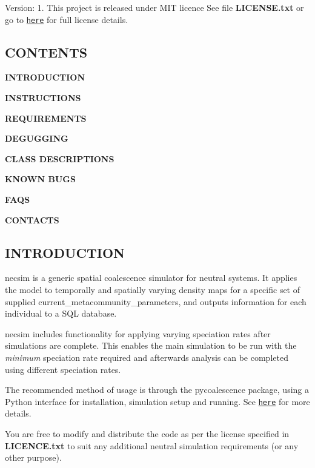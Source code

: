 Version\+: 1. This project is released under M\+IT licence See file {\bfseries L\+I\+C\+E\+N\+S\+E.\+txt} or go to \href{https://opensource.org/licenses/MIT}{\tt here} for full license details.

\subsection*{C\+O\+N\+T\+E\+N\+TS}


\begin{DoxyItemize}
\item {\bfseries I\+N\+T\+R\+O\+D\+U\+C\+T\+I\+ON}
\item {\bfseries I\+N\+S\+T\+R\+U\+C\+T\+I\+O\+NS}
\item {\bfseries R\+E\+Q\+U\+I\+R\+E\+M\+E\+N\+TS}
\item {\bfseries D\+E\+G\+U\+G\+G\+I\+NG}
\item {\bfseries C\+L\+A\+SS D\+E\+S\+C\+R\+I\+P\+T\+I\+O\+NS}
\item {\bfseries K\+N\+O\+WN B\+U\+GS}
\item {\bfseries F\+A\+QS}
\item {\bfseries C\+O\+N\+T\+A\+C\+TS}
\end{DoxyItemize}

\subsection*{I\+N\+T\+R\+O\+D\+U\+C\+T\+I\+ON}

necsim is a generic spatial coalescence simulator for neutral systems. It applies the model to temporally and spatially varying density maps for a specific set of supplied current\+\_\+metacommunity\+\_\+parameters, and outputs information for each individual to a S\+QL database.

necsim includes functionality for applying varying speciation rates after simulations are complete. This enables the main simulation to be run with the {\itshape minimum} speciation rate required and afterwards analysis can be completed using different speciation rates.

The recommended method of usage is through the pycoalescence package, using a Python interface for installation, simulation setup and running. See \href{http://pycoalescence.readthedocs.io/}{\tt here} for more details.

You are free to modify and distribute the code as per the license specified in {\bfseries L\+I\+C\+E\+N\+C\+E.\+txt} to suit any additional neutral simulation requirements (or any other purpose).

